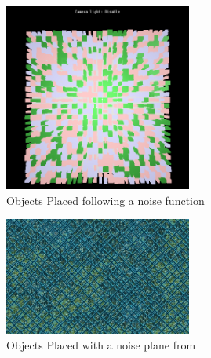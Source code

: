 \begin{figure}[htbp]
    \centering
    \includegraphics[width=0.55\textwidth]{img/Theory/Perlin_Noise/AppletNoName201501191604.png}
    \caption{Objects Placed following a noise function}
    \label{fig:MyNCity}
\end{figure}

\begin{figure}[htbp]
	\centering
	\includegraphics[width=0.55\textwidth]{img/Theory/Perlin_Noise/NoisyCity.jpg}
	\caption{Objects Placed with a noise plane from \cite{NoisesGAMES}}
	\label{fig:NCity}
\end{figure}

